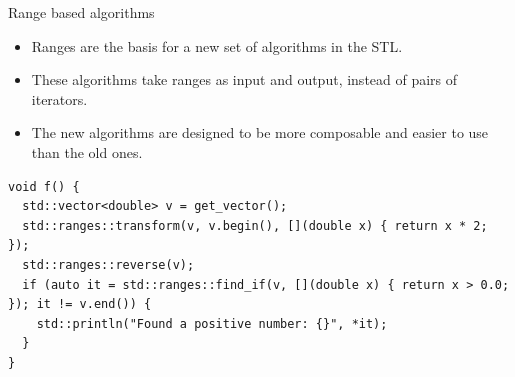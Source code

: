 \begin{frame}[t,fragile]{Range based algorithms}
\begin{itemize}
  \item Ranges are the basis for a new set of algorithms in the STL.
  \item These algorithms take ranges as input and output, instead of pairs of iterators.
  \item The new algorithms are designed to be more composable and easier to use than the old ones.
\end{itemize}

\begin{lstlisting}
void f() {
  std::vector<double> v = get_vector();
  std::ranges::transform(v, v.begin(), [](double x) { return x * 2; });
  std::ranges::reverse(v);
  if (auto it = std::ranges::find_if(v, [](double x) { return x > 0.0; }); it != v.end()) {
    std::println("Found a positive number: {}", *it);
  }
}
\end{lstlisting}
\end{frame}